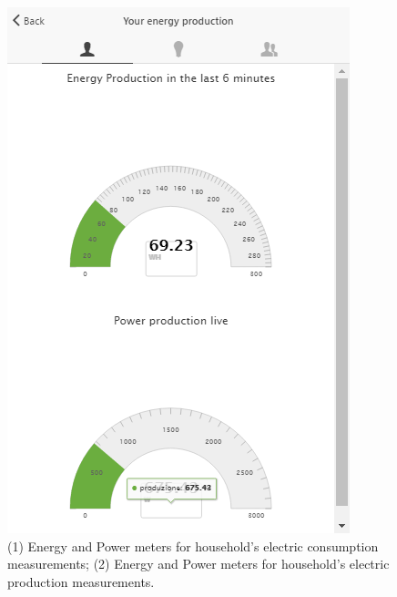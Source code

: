 \begin{figure}
\begin{center}
\begin{minipage}[htb]{0.45\linewidth}
         \includegraphics[width=1\linewidth]{img/visual_production.png}  
        \end{minipage}
      \end{center}
    \caption{(1) Energy and Power meters for household's electric consumption measurements; (2) Energy and Power meters for household's electric production measurements.
}
\label{fig:viz_rt}
\end{figure}

